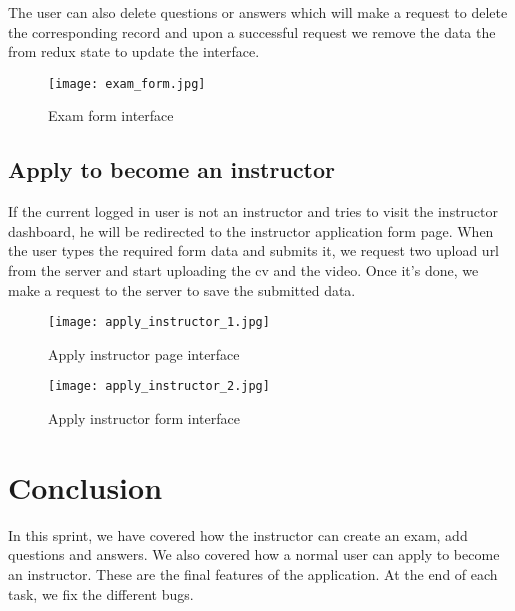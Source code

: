 The user can also delete questions or answers which will make a request to delete the corresponding record and upon a successful request we remove the data the from redux state to update the interface.

\begin{figure}[!ht]
    \centering
    \texttt{[image: exam\_form.jpg]}
    \caption{Exam form interface}
    \label{fig:exam_form}
\end{figure}

\subsection{Apply to become an instructor}
If the current logged in user is not an instructor and tries to visit the instructor dashboard, he will be redirected to the instructor application form page.
When the user types the required form data and submits it, we request two upload url from the server and start uploading the cv and the video. Once it's done, we make a request to the server to save the submitted data.
\hfill \break
\hfill \break

\vfill
\clearpage

\begin{figure}[!ht]
    \centering
    \texttt{[image: apply\_instructor\_1.jpg]}
    \caption{Apply instructor page interface}
    \label{fig:apply_instructor_1}
\end{figure}


\hfill \break
\hfill \break
\hfill \break
\hfill \break

\begin{figure}[!ht]
    \centering
    \texttt{[image: apply\_instructor\_2.jpg]}
    \caption{Apply instructor form interface}
    \label{fig:apply_instructor_2}
\end{figure}


\vfill
\clearpage

\section*{Conclusion}
In this sprint, we have covered how the instructor can create an exam, add questions and answers. We also covered how a normal user can apply to become an instructor. These are the final features of the application. At the end of each task, we fix the different bugs.